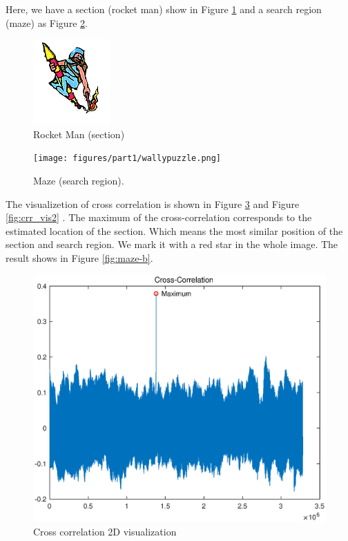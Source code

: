 Here, we have a section (rocket man) show in Figure \ref{fig:rocketman} and a search region (maze) as Figure \ref{fig:maze-a}.

\begin{figure}[h!]
	\begin{center}
		\includegraphics[width=0.40\linewidth]{figures/part1/wallypuzzle_rocketman.png}
	\end{center}
	\caption{Rocket Man (section)}
	\label{fig:rocketman}
\end{figure} 

\begin{figure}[h!]
	\centering
	\texttt{[image: figures/part1/wallypuzzle.png]}
	\centering
	\caption{Maze (search region). }
	\label{fig:maze-a}
\end{figure} 

The visualizetion of cross correlation is shown in Figure \ref{fig:crr_vis} and Figure \ref{fig:crr_vis2} . The maximum of the cross-correlation corresponds to the estimated location of the section. Which means the most similar position of the section and search region. We mark it with a red star in the whole image. The result shows in Figure \ref{fig:maze-b}.

\begin{figure}[h!]
	\begin{center}
		\includegraphics[width=0.40\linewidth]{figures/part1/crr_vis.eps}
	\end{center}
	\caption{Cross correlation 2D visualization}
	\label{fig:crr_vis}
\end{figure} 

